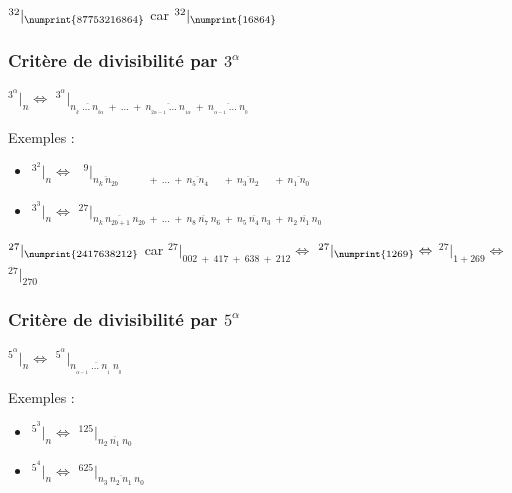 \documentclass[a4paper]{article}
\begin{document}
{\Large $^{32}|_{\numprint{87 753 216 864}}$} car {\Large $^{32}|_{\numprint{16 864}}$ }

\vfill
{\noindent \dotfill}

\subsubsection*{Critère de divisibilité par $3^\alpha$}

\begin{center}
	\huge
	$ ^{3^{\alpha}}|_n \Leftrightarrow$ $^{3^{\alpha}}|_{\overline{n_{_{k}}~\dots~n_{_{b\alpha}}}~+~\dots~+~\overline{n_{_{2\alpha - 1}}~\dots~n_{_{1\alpha}}}~+~\overline{n_{_{\alpha -1}}~\dots~n_{_0}}} $
\end{center}


Exemples :

\begin{Large}
\begin{itemize}

	\item[] $ ^{3^{2}}|_n \Leftrightarrow$ $^{\phantom{0}9}|_{\overline{n_k~n_{2b}}\phantom{~n_{2b + 1}}~+~\dots~+~\overline{n_5~n_4}\phantom{~n_3}~+~\overline{n_3~n_2}\phantom{~n_3}~+~\overline{n_1~n_0}} $
	\item[] $ ^{3^{3}}|_n \Leftrightarrow$ $^{27}|_{\overline{n_k~n_{2b + 1}~n_{2b}}~+~\dots~+~\overline{n_8~n_7~n_6}~+~\overline{n_5~n_4~n_3}~+~\overline{n_2~n_1~n_0}} $\\

\end{itemize}
\end{Large}

{\Large $^{27}|_{\numprint{2417638212}}$} car {\Large $^{27}|_{002~+~417~+~638~+~212} \Leftrightarrow$ $^{27}|_{\numprint{1269}} \Leftrightarrow$ $^{27}|_{1 + 269} \Leftrightarrow$ $^{27}|_{270}$}

\vfill
{\noindent \dotfill}

\subsubsection*{Critère de divisibilité par $5^\alpha$}

\begin{center}
	\huge
	$ ^{5^{\alpha}}|_n \Leftrightarrow$ $^{5^{\alpha}}|_{\overline{n_{_{\alpha-1}}~\dots~n_{_1}~n_{_0}}} $
\end{center}


Exemples :

\begin{Large}
\begin{itemize}

	\item[] $ ^{5^{3}}|_n \Leftrightarrow$ $^{125}|_{\overline{n_2~n_1~n_0}} $
	\item[] $ ^{5^{4}}|_n \Leftrightarrow$ $^{625}|_{\overline{n_3~n_2~n_1~n_0}} $\\

\end{itemize}
\end{Large}
\end{document}
